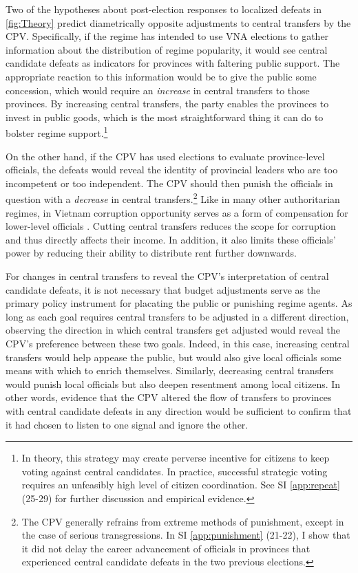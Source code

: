 \documentclass[12pt]{article}
\newcommand\fnote[1]{\footnote{\baselineskip=2\normalbaselineskip#1}}
\newcommand{\1}{\mathbbm{1}}
\begin{document}
Two of the hypotheses about post-election responses to localized defeats in \autoref{fig:Theory} predict diametrically opposite adjustments to central transfers by the CPV. Specifically, if the regime has intended to use VNA elections to gather information about the distribution of regime popularity, it would see central candidate defeats as indicators for provinces with faltering public support. The appropriate reaction to this information would be to give the public some concession, which would require an \textit{increase} in central transfers to those provinces. By increasing central transfers, the party enables the provinces to invest in public goods, which is the most straightforward thing it can do to bolster regime support.\fnote{In theory, this strategy may create perverse incentive for citizens to keep voting against central candidates. In practice, successful strategic voting requires an unfeasibly high level of citizen coordination. See SI \ref{app:repeat} (25-29) for further discussion and empirical evidence.}

On the other hand, if the CPV has used elections to evaluate province-level officials, the defeats would reveal the identity of provincial leaders who are too incompetent or too independent. The CPV should then punish the officials in question with a \textit{decrease} in central transfers.\fnote{The CPV generally refrains from extreme methods of punishment, except in the case of serious transgressions. In SI \ref{app:punishment} (21-22), I show that it did not delay the career advancement of officials in provinces that experienced central candidate defeats in the two previous elections.} Like in many other authoritarian regimes, in Vietnam corruption opportunity serves as a form of compensation for lower-level officials \citep{Darden2008}. Cutting central transfers reduces the scope for corruption and thus directly affects their income. In addition, it also limits these officials' power by reducing their ability to distribute rent further downwards.

For changes in central transfers to reveal the CPV's interpretation of central candidate defeats, it is not necessary that budget adjustments serve as the primary policy instrument for placating the public or punishing regime agents. As long as each goal requires central transfers to be adjusted in a different direction, observing the direction in which central transfers get adjusted would reveal the CPV's preference between these two goals. Indeed, in this case, increasing central transfers would help appease the public, but would also give local officials some means with which to enrich themselves. Similarly, decreasing central transfers would punish local officials but also deepen resentment among local citizens. In other words, evidence that the CPV altered the flow of transfers to provinces with central candidate defeats in any direction would be sufficient to confirm that it had chosen to listen to one signal and ignore the other.
\end{document}
